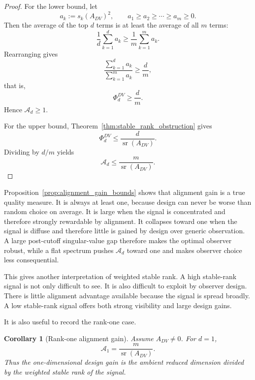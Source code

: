 \documentclass[11pt,a4paper]{article}
\numberwithin{equation}{section}
\theoremstyle{thmcompact}
\newtheorem{corollary}[theorem]{Corollary}
\theoremstyle{remark}
\begin{document}
\begin{proof}
For the lower bound, let
\begin{equation}
a_k:=s_k(A_{DV})^2,
\qquad
a_1\ge a_2\ge \cdots \ge a_m\ge 0.
\end{equation}
Then the average of the top \(d\) terms is at least the average of all \(m\) terms:
\begin{equation}
\frac1d\sum_{k=1}^{d}a_k
\ge
\frac1m\sum_{k=1}^{m}a_k.
\end{equation}
Rearranging gives
\begin{equation}
\frac{\sum_{k=1}^{d}a_k}{\sum_{k=1}^{m}a_k}
\ge
\frac{d}{m},
\end{equation}
that is,
\begin{equation}
\Phi_d^{DV}\ge \frac{d}{m}.
\end{equation}
Hence \(\mathcal A_d\ge 1\).

For the upper bound, Theorem~\ref{thm:stable_rank_obstruction} gives
\begin{equation}
\Phi_d^{DV}\le \frac{d}{\operatorname{sr}(A_{DV})}.
\end{equation}
Dividing by \(d/m\) yields
\begin{equation}
\mathcal A_d\le \frac{m}{\operatorname{sr}(A_{DV})}.
\end{equation}
\end{proof}

Proposition~\ref{prop:alignment_gain_bounds} shows that alignment gain is a true quality measure. It is always at least one, because design can never be worse than random choice on average. It is large when the signal is concentrated and therefore strongly rewardable by alignment. It collapses toward one when the signal is diffuse and therefore little is gained by design over generic observation. A large post-cutoff singular-value gap therefore makes the optimal observer robust, while a flat spectrum pushes \(\mathcal A_d\) toward one and makes observer choice less consequential.

This gives another interpretation of weighted stable rank. A high stable-rank signal is not only difficult to see. It is also difficult to exploit by observer design. There is little alignment advantage available because the signal is spread broadly. A low stable-rank signal offers both strong visibility and large design gains.

It is also useful to record the rank-one case.

\begin{corollary}[Rank-one alignment gain]
\label{cor:rank_one_alignment_gain}
Assume \(A_{DV}\neq 0\). For \(d=1\),
\begin{equation}
\mathcal A_1=\frac{m}{\operatorname{sr}(A_{DV})}.
\end{equation}
Thus the one-dimensional design gain is the ambient reduced dimension divided by the weighted stable rank of the signal.
\end{corollary}
\end{document}
